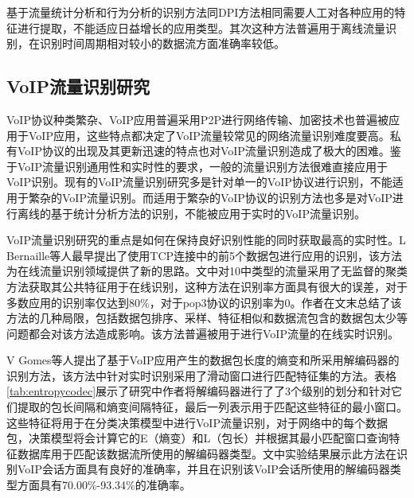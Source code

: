 基于流量统计分析和行为分析的识别方法同DPI方法相同需要人工对各种应用的特征进行提取，不能适应日益增长的应用类型。其次这种方法普遍用于离线流量识别，在识别时间周期相对较小的数据流方面准确率较低。



\subsection{VoIP流量识别研究}
VoIP协议种类繁杂、VoIP应用普遍采用P2P进行网络传输、加密技术也普遍被应用于VoIP应用，这些特点都决定了VoIP流量较常见的网络流量识别难度要高。私有VoIP协议的出现及其更新迅速的特点也对VoIP流量识别造成了极大的困难。鉴于VoIP流量识别通用性和实时性的要求，一般的流量识别方法很难直接应用于VoIP识别。现有的VoIP流量识别研究多是针对单一的VoIP协议进行识别，不能适用于繁杂的VoIP流量识别。而适用于繁杂的VoIP协议的识别方法也多是对VoIP进行离线的基于统计分析方法的识别，不能被应用于实时的VoIP流量识别。

VoIP流量识别研究的重点是如何在保持良好识别性能的同时获取最高的实时性。L Bernaille等人最早提出了使用TCP连接中的前5个数据包进行应用的识别\supercite{voipmethod1}，该方法为在线流量识别领域提供了新的思路。文中对10中类型的流量采用了无监督的聚类方法获取其公共特征用于在线识别，这种方法在识别率方面具有很大的误差，对于多数应用的识别率仅达到80\%，对于pop3协议的识别率为0。作者在文末总结了该方法的几种局限，包括数据包排序、采样、特征相似和数据流包含的数据包太少等问题都会对该方法造成影响。该方法普遍被用于进行VoIP流量的在线实时识别。

V Gomes等人提出了基于VoIP应用产生的数据包长度的熵变和所采用解编码器的识别方法\supercite{4}，该方法中针对实时识别采用了滑动窗口进行匹配特征集的方法。表格\ref{tab:entropycodec}展示了研究中作者将解编码器进行了了3个级别的划分和针对它们提取的包长间隔和熵变间隔特征，最后一列表示用于匹配这些特征的最小窗口。这些特征将用于在分类决策模型中进行VoIP流量识别，对于网络中的每个数据包，决策模型将会计算它的E（熵变）和L（包长）并根据其最小匹配窗口查询特征数据库用于匹配该数据流所使用的解编码器类型。文中实验结果展示此方法在识别VoIP会话方面具有良好的准确率，并且在识别该VoIP会话所使用的解编码器类型方面具有70.00\%-93.34\%的准确率。




